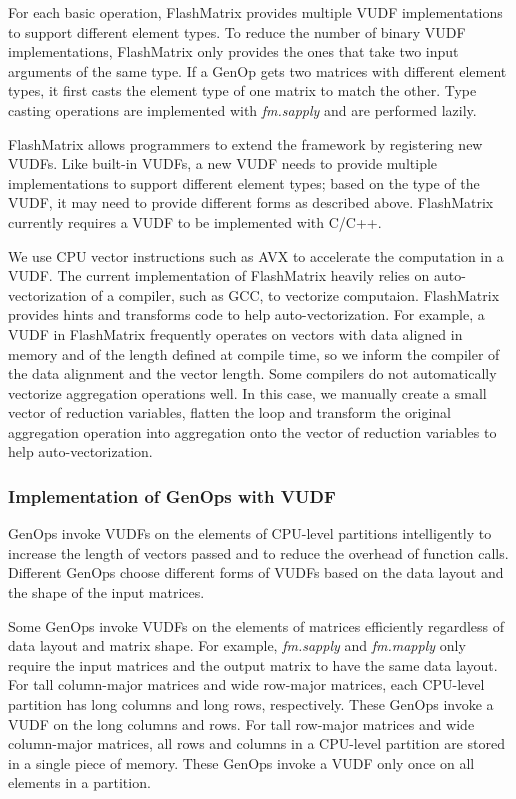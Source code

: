 For each basic operation, FlashMatrix provides multiple VUDF
implementations to support different element types. To reduce the number
of binary VUDF implementations, FlashMatrix only provides the ones that take
two input arguments of the same type. If a GenOp gets two matrices with different
element types, it first casts the element type of one matrix to match
the other. %
Type casting operations are
implemented with \textit{fm.sapply} and are performed lazily.

FlashMatrix allows programmers to extend the framework by registering new VUDFs.
Like built-in VUDFs, a new VUDF needs to provide multiple
implementations to support different element types; based on the type of
the VUDF, it may need to provide different forms as described above.
FlashMatrix currently requires a VUDF to be implemented with C/C++.

We use CPU vector instructions such as AVX \cite{avx} to accelerate
the computation in a VUDF. The current implementation of FlashMatrix heavily
relies on auto-vectorization of a compiler, such as GCC, to vectorize
computaion. FlashMatrix provides hints and
transforms code to help auto-vectorization. For example, a VUDF in FlashMatrix
frequently operates on vectors with data aligned in memory and of
the length defined at compile time, so we inform the compiler of the data alignment
and the vector length. Some compilers do not automatically vectorize
aggregation operations well. In this case, we manually create a small vector of reduction
variables, flatten the loop and transform the original aggregation operation
into aggregation onto the vector of reduction variables to help auto-vectorization.

\subsubsection{Implementation of GenOps with VUDF}

GenOps invoke VUDFs on the elements of CPU-level partitions intelligently
to increase the length of vectors passed and to reduce the overhead of
function calls. Different GenOps choose different
forms of VUDFs based on the data layout and the shape of the input matrices.

Some GenOps invoke VUDFs on the elements of matrices efficiently regardless of
data layout and matrix shape.
For example, \textit{fm.sapply} and \textit{fm.mapply} only require
the input matrices and the output matrix to have the same data layout. For tall
column-major matrices and wide row-major matrices, each CPU-level partition has
long columns and long rows, respectively. These GenOps invoke a VUDF
on the long columns and rows. For tall row-major matrices and wide column-major
matrices, all rows and columns in a CPU-level partition are stored in a single
piece of memory. These GenOps invoke a VUDF only once on all
elements in a partition. %

